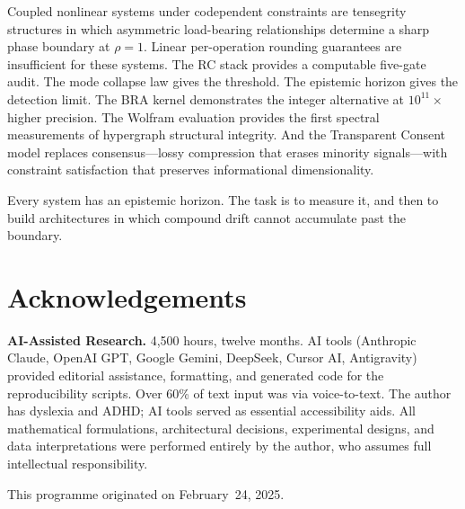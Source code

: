\documentclass[10pt,twocolumn]{article}
\theoremstyle{definition}
\theoremstyle{remark}
\begin{document}
Coupled nonlinear systems under codependent constraints are tensegrity structures in which asymmetric load-bearing relationships determine a sharp phase boundary at $\rho = 1$.  Linear per-operation rounding guarantees are insufficient for these systems.  The RC stack provides a computable five-gate audit.  The mode collapse law gives the threshold.  The epistemic horizon gives the detection limit.  The BRA kernel demonstrates the integer alternative at $10^{11}\times$ higher precision.  The Wolfram evaluation provides the first spectral measurements of hypergraph structural integrity.  And the Transparent Consent model replaces consensus---lossy compression that erases minority signals---with constraint satisfaction that preserves informational dimensionality.

Every system has an epistemic horizon.  The task is to measure it, and then to build architectures in which compound drift cannot accumulate past the boundary.

\section*{Acknowledgements}
\small
\textbf{AI-Assisted Research.}  4,500 hours, twelve months.  AI tools (Anthropic Claude, OpenAI GPT, Google Gemini, DeepSeek, Cursor AI, Antigravity) provided editorial assistance, formatting, and generated code for the reproducibility scripts.  Over 60\% of text input was via voice-to-text.  The author has dyslexia and ADHD; AI tools served as essential accessibility aids.  All mathematical formulations, architectural decisions, experimental designs, and data interpretations were performed entirely by the author, who assumes full intellectual responsibility.

This programme originated on February~24, 2025.
\end{document}
